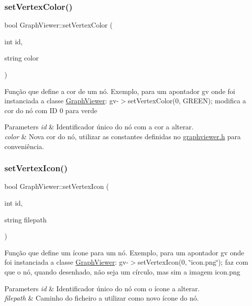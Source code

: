 \subsubsection{\texorpdfstring{set\+Vertex\+Color()}{setVertexColor()}}
{\footnotesize\ttfamily bool Graph\+Viewer\+::set\+Vertex\+Color (\begin{DoxyParamCaption}\item[{int}]{id,  }\item[{string}]{color }\end{DoxyParamCaption})}

Função que define a cor de um nó. Exemplo, para um apontador gv onde foi instanciada a classe \hyperlink{class_graph_viewer}{Graph\+Viewer}\+: gv-\/$>$set\+Vertex\+Color(0, G\+R\+E\+E\+N); modifica a cor do nó com ID 0 para verde


\begin{DoxyParams}{Parameters}
{\em id} & Identificador único do nó com a cor a alterar. \\
\hline
{\em color} & Nova cor do nó, utilizar as constantes definidas no \hyperlink{graphviewer_8h}{graphviewer.\+h} para conveniência. \\
\hline
\end{DoxyParams}
\hypertarget{class_graph_viewer_a02d5f7393eab9a2d1b66719039597a64}{}\label{class_graph_viewer_a02d5f7393eab9a2d1b66719039597a64} 
\subsubsection{\texorpdfstring{set\+Vertex\+Icon()}{setVertexIcon()}}
{\footnotesize\ttfamily bool Graph\+Viewer\+::set\+Vertex\+Icon (\begin{DoxyParamCaption}\item[{int}]{id,  }\item[{string}]{filepath }\end{DoxyParamCaption})}

Função que define um ícone para um nó. Exemplo, para um apontador gv onde foi instanciada a classe \hyperlink{class_graph_viewer}{Graph\+Viewer}\+: gv-\/$>$set\+Vertex\+Icon(0, \char`\"{}icon.\+png\char`\"{}); faz com que o nó, quando desenhado, não seja um círculo, mas sim a imagem icon.\+png


\begin{DoxyParams}{Parameters}
{\em id} & Identificador único do nó com o ícone a alterar. \\
\hline
{\em filepath} & Caminho do ficheiro a utilizar como novo ícone do nó. \\
\hline
\end{DoxyParams}
\hypertarget{class_graph_viewer_ac25d7d007022fda16799808ba136e909}{}\label{class_graph_viewer_ac25d7d007022fda16799808ba136e909} 
